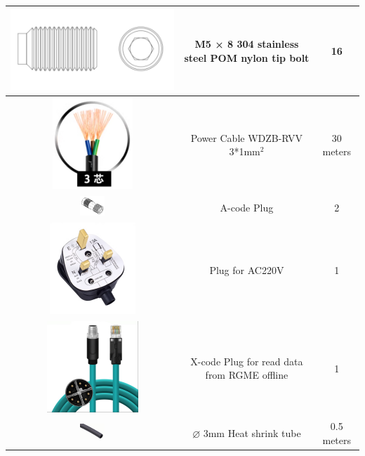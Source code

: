\documentclass{article}
\begin{document}
\begin{table}[H]
\begin{tabular}{|c|c|c|}
        \includegraphics{M5x8.png}              &  M5 × 8 304 stainless steel POM nylon tip bolt           & 16 \\ \hline
        \includegraphics{Power cable.png}                    & Power Cable WDZB-RVV 3*1mm$^2$             & 30 meters \\   \hline
        \includegraphics[width=0.15\textwidth]{A-code.png}                    & A-code Plug                                            & 2 \\ \hline
        \includegraphics{Plug.png}                  & Plug for AC220V                                      & 1 \\ \hline
        \includegraphics{X-code.png}                    & X-code Plug for read data from RGME offline       & 1 \\ \hline
        \includegraphics[width=0.15\textwidth]{热缩管.png}                    & $\varnothing$ 3mm Heat shrink tube               & 0.5 meters\\ \hline

\end{tabular}
\end{table}
\end{document}
